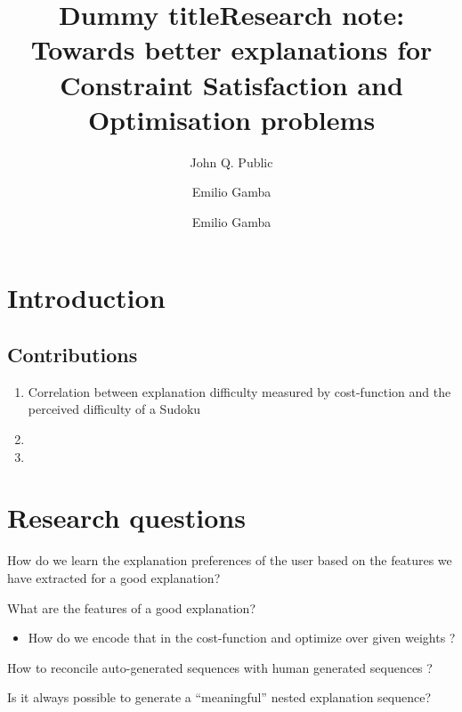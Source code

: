 \documentclass[a4paper,UKenglish,cleveref, autoref, thm-restate]{lipics-v2021}
\title{Dummy title} %
\author{John Q. Public}{Dummy University Computing Laboratory, [optional: Address], Country \and My second affiliation, Country \and \url{http://www.myhomepage.edu} }{johnqpublic@dummyuni.org}{https://orcid.org/0000-0002-1825-0097}{(Optional) author-specific funding acknowledgements}%
\author{Emilio Gamba}{Data Analytics Lab, VUB, Belgium}{emilio.gamba@vub.be}{[0000-0003-1720-9428]}{}
\begin{document}
	
	\title{Research note: Towards better explanations for Constraint Satisfaction and Optimisation problems}
	\date{}
	\author{Emilio Gamba}
		\maketitle
	\thispagestyle{empty}
	\section{Introduction}

	

	\subsection{Contributions}
	\begin{enumerate}
		\item Correlation between explanation difficulty measured by cost-function and the perceived difficulty of a Sudoku
		\item 
		\item 
	\end{enumerate}




	\section{Research questions}
	\begin{RQ}
		\item How do we learn the explanation preferences of the user based on the features we have extracted for a good explanation?
		\item What are the features of a good explanation?
		\begin{itemize}
			\item How do we encode that in the cost-function and optimize over given weights ?
		\end{itemize}
		\item How to reconcile auto-generated sequences with human generated sequences ? 
		\item Is it always possible to generate a ``meaningful'' nested explanation sequence? 
		
\end{RQ}
\end{document}
